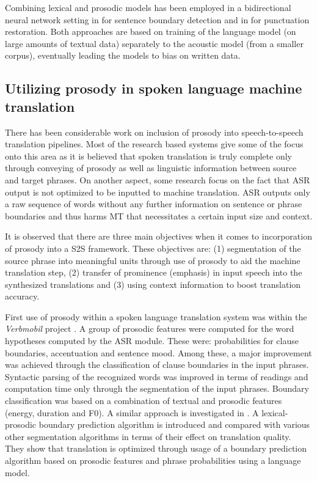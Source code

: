\cite{Che2016PunctuationPF, Schlangen2017JointID, batista2012bilingual}

Combining lexical and prosodic models has been employed in a bidirectional neural network setting in \cite{Xu2017} for sentence boundary detection and in \cite{tilk2016bidirectional} for punctuation restoration. Both approaches are based on training of the language model (on large amounts of textual data) separately to the acoustic model (from a smaller corpus), eventually leading the models to bias on written data. 

\subsection{Utilizing prosody in spoken language machine translation}
\label{sota:prosody_in_smt}
There has been considerable work on inclusion of prosody into speech-to-speech translation pipelines. Most of the research based systems give some of the focus onto this area as it is believed that spoken translation is truly complete only through conveying of prosody as well as linguistic information between source and target phrases. On another aspect, some research focus on the fact that ASR output is not optimized to be inputted to machine translation. ASR outputs only a raw sequence of words without any further information on sentence or phrase boundaries and thus harms MT that necessitates a certain input size and context. 

It is observed that there are three main objectives when it comes to incorporation of prosody into a S2S framework. These objectives are: (1) segmentation of the source phrase into meaningful units through use of prosody to aid the machine translation step, (2) transfer of prominence (emphasis) in input speech into the synthesized translations and (3) using context information to boost translation accuracy. 

First use of prosody within a spoken language translation system was within the \textit{Verbmobil} project \citep{verbmobil_prosody}. A group of prosodic features were computed for the word hypotheses computed by the ASR module. These were: probabilities for clause boundaries, accentuation and sentence mood. Among these, a major improvement was achieved through the classification of clause boundaries in the input phrases. Syntactic parsing of the recognized words was improved in terms of readings and computation time only through the segmentation of the input phrases. Boundary classification was based on a combination of textual and prosodic features (energy, duration and F0). A similar approach is investigated in \cite{Matusov07improvingspeech}. A lexical-prosodic boundary prediction algorithm is introduced and compared with various other segmentation algorithms in terms of their effect on translation quality. They show that translation is optimized through usage of a boundary prediction algorithm based on prosodic features and phrase probabilities using a language model. 

